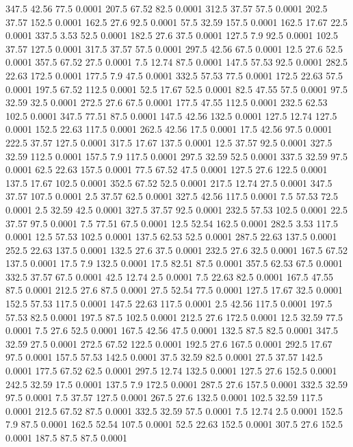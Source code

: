347.5	42.56	77.5	0.0001
207.5	67.52	82.5	0.0001
312.5	37.57	57.5	0.0001
202.5	37.57	152.5	0.0001
162.5	27.6	92.5	0.0001
57.5	32.59	157.5	0.0001
162.5	17.67	22.5	0.0001
337.5	3.53	52.5	0.0001
182.5	27.6	37.5	0.0001
127.5	7.9	92.5	0.0001
102.5	37.57	127.5	0.0001
317.5	37.57	57.5	0.0001
297.5	42.56	67.5	0.0001
12.5	27.6	52.5	0.0001
357.5	67.52	27.5	0.0001
7.5	12.74	87.5	0.0001
147.5	57.53	92.5	0.0001
282.5	22.63	172.5	0.0001
177.5	7.9	47.5	0.0001
332.5	57.53	77.5	0.0001
172.5	22.63	57.5	0.0001
197.5	67.52	112.5	0.0001
52.5	17.67	52.5	0.0001
82.5	47.55	57.5	0.0001
97.5	32.59	32.5	0.0001
272.5	27.6	67.5	0.0001
177.5	47.55	112.5	0.0001
232.5	62.53	102.5	0.0001
347.5	77.51	87.5	0.0001
147.5	42.56	132.5	0.0001
127.5	12.74	127.5	0.0001
152.5	22.63	117.5	0.0001
262.5	42.56	17.5	0.0001
17.5	42.56	97.5	0.0001
222.5	37.57	127.5	0.0001
317.5	17.67	137.5	0.0001
12.5	37.57	92.5	0.0001
327.5	32.59	112.5	0.0001
157.5	7.9	117.5	0.0001
297.5	32.59	52.5	0.0001
337.5	32.59	97.5	0.0001
62.5	22.63	157.5	0.0001
77.5	67.52	47.5	0.0001
127.5	27.6	122.5	0.0001
137.5	17.67	102.5	0.0001
352.5	67.52	52.5	0.0001
217.5	12.74	27.5	0.0001
347.5	37.57	107.5	0.0001
2.5	37.57	62.5	0.0001
327.5	42.56	117.5	0.0001
7.5	57.53	72.5	0.0001
2.5	32.59	42.5	0.0001
327.5	37.57	92.5	0.0001
232.5	57.53	102.5	0.0001
22.5	37.57	97.5	0.0001
7.5	77.51	67.5	0.0001
12.5	52.54	162.5	0.0001
282.5	3.53	117.5	0.0001
12.5	57.53	102.5	0.0001
137.5	62.53	52.5	0.0001
287.5	22.63	137.5	0.0001
252.5	22.63	137.5	0.0001
132.5	27.6	37.5	0.0001
232.5	27.6	32.5	0.0001
167.5	67.52	137.5	0.0001
17.5	7.9	132.5	0.0001
17.5	82.51	87.5	0.0001
357.5	62.53	67.5	0.0001
332.5	37.57	67.5	0.0001
42.5	12.74	2.5	0.0001
7.5	22.63	82.5	0.0001
167.5	47.55	87.5	0.0001
212.5	27.6	87.5	0.0001
27.5	52.54	77.5	0.0001
127.5	17.67	32.5	0.0001
152.5	57.53	117.5	0.0001
147.5	22.63	117.5	0.0001
2.5	42.56	117.5	0.0001
197.5	57.53	82.5	0.0001
197.5	87.5	102.5	0.0001
212.5	27.6	172.5	0.0001
12.5	32.59	77.5	0.0001
7.5	27.6	52.5	0.0001
167.5	42.56	47.5	0.0001
132.5	87.5	82.5	0.0001
347.5	32.59	27.5	0.0001
272.5	67.52	122.5	0.0001
192.5	27.6	167.5	0.0001
292.5	17.67	97.5	0.0001
157.5	57.53	142.5	0.0001
37.5	32.59	82.5	0.0001
27.5	37.57	142.5	0.0001
177.5	67.52	62.5	0.0001
297.5	12.74	132.5	0.0001
127.5	27.6	152.5	0.0001
242.5	32.59	17.5	0.0001
137.5	7.9	172.5	0.0001
287.5	27.6	157.5	0.0001
332.5	32.59	97.5	0.0001
7.5	37.57	127.5	0.0001
267.5	27.6	132.5	0.0001
102.5	32.59	117.5	0.0001
212.5	67.52	87.5	0.0001
332.5	32.59	57.5	0.0001
7.5	12.74	2.5	0.0001
152.5	7.9	87.5	0.0001
162.5	52.54	107.5	0.0001
52.5	22.63	152.5	0.0001
307.5	27.6	152.5	0.0001
187.5	87.5	87.5	0.0001
